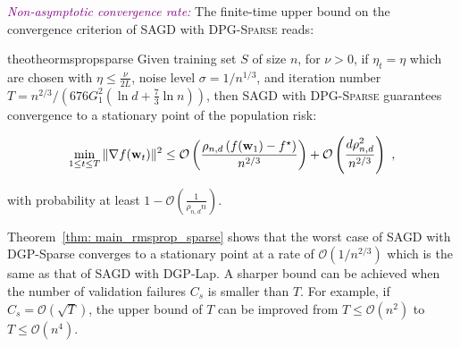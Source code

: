 \documentclass[11pt]{article}
\begin{document}
\textcolor{purple}{\textit{Non-asymptotic convergence rate:}}
The finite-time upper bound on the convergence criterion of \textsc{SAGD} with \textsc{DPG-Sparse} reads:
\begin{restatable}{theo}{theormspropsparse}
\label{thm: main_rmsprop_sparse}
 Given training set $S$ of size $n$, for $\nu >0$, if $\eta_t = \eta$ which are chosen with $\eta \leq \frac{\nu}{2L}$, noise level $\sigma = 1/n^{1/3}$, and iteration number $T = n^{2/3}/\left(676G_1^2(\ln d + \frac{7}{3}\ln n)\right)$, then \textsc{SAGD} with \textsc{DPG-Sparse}  guarantees convergence to a stationary point of the population risk:
  \begin{small}
\begin{equation*}
 \min_{1\leq t\leq T}\|\nabla f(\mathbf{w}_t)\|^2 \leq
\mathcal{O} \left( \frac{\rho_{n,d} \left(f(\mathbf{w}_1) - f^\star \right)}{n^{2/3}} \right) +\mathcal{O} \left( \frac{d \rho_{n,d}^2}{n^{2/3}}\right)~,
\end{equation*}
\end{small}
with probability at least $1-\mathcal{O} \left(\frac{1}{\rho_{n,d} n}\right)$.
\end{restatable} 
Theorem~\ref{thm: main_rmsprop_sparse} shows that the worst case of \textsc{SAGD} with DGP-Sparse converges to a stationary point at a rate of $\mathcal{O}(1/n^{2/3})$ which is the same as that of \textsc{SAGD} with DGP-Lap. 
A sharper bound can be achieved when the number of validation failures $C_{s}$ is smaller than $T$. 
For example, if $C_{s} = \mathcal{O}(\sqrt{T})$, the upper bound of $T$ can be improved from $T \leq \mathcal{O}(n^2)$ to $T \leq \mathcal{O}(n^4)$.
\vspace{-0.05in}
\end{document}
